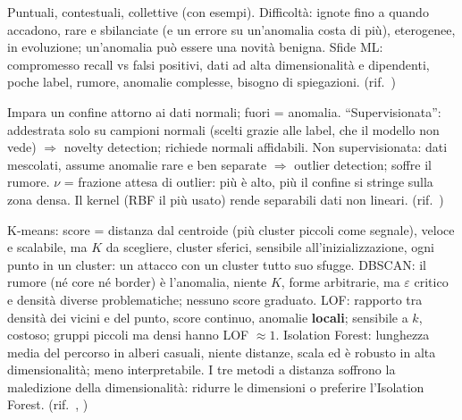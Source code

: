 \begin{soluzione}[A13 -- Anomalie]
Puntuali, contestuali, collettive (con esempi). Difficoltà: ignote fino a quando accadono, rare e sbilanciate (e un
        errore su un'anomalia costa di più), eterogenee, in evoluzione; un'anomalia può essere una novità benigna. Sfide ML: compromesso recall
        vs falsi positivi, dati ad alta dimensionalità e dipendenti, poche label, rumore, anomalie complesse, bisogno di spiegazioni.
(rif.\ )
\end{soluzione}

\begin{soluzione}
Impara un confine attorno ai dati normali; fuori = anomalia. ``Supervisionata'': addestrata solo su
        campioni normali (scelti grazie alle label, che il modello non vede) $\Rightarrow$ novelty detection; richiede normali affidabili.
        Non supervisionata: dati mescolati, assume anomalie rare e ben separate $\Rightarrow$ outlier detection; soffre il rumore. $\nu$ = frazione
        attesa di outlier: più è alto, più il confine si stringe sulla zona densa. Il kernel (RBF il più usato) rende separabili dati non lineari.
(rif.\ )
\end{soluzione}

\begin{soluzione}
K-means: score = distanza dal centroide (più cluster piccoli come segnale), veloce e
        scalabile, ma $K$ da scegliere, cluster sferici, sensibile all'inizializzazione, ogni punto in un cluster: un attacco con un cluster
        tutto suo sfugge. DBSCAN: il rumore (né core né border) è l'anomalia, niente $K$, forme arbitrarie, ma $\varepsilon$ critico e densità
        diverse problematiche; nessuno score graduato. LOF: rapporto tra densità dei vicini e del punto, score continuo, anomalie
        \textbf{locali}; sensibile a $k$, costoso; gruppi piccoli ma densi hanno LOF $\approx 1$. Isolation Forest: lunghezza media del percorso
        in alberi casuali, niente distanze, scala ed è robusto in alta dimensionalità; meno interpretabile. I tre metodi a distanza soffrono la
        maledizione della dimensionalità: ridurre le dimensioni o preferire l'Isolation Forest.
(rif.\ , )
\end{soluzione}

